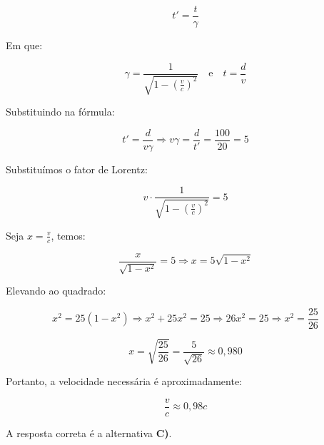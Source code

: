 \begin{flushleft}
\[
t' = \frac{t}{\gamma}
\]

Em que:

\[
\gamma = \frac{1}{\sqrt{1 - \left(\frac{v}{c}\right)^2}}
\quad \text{e} \quad
t = \frac{d}{v}
\]

Substituindo na fórmula:

\[
t' = \frac{d}{v \gamma}
\Rightarrow v\gamma = \frac{d}{t'} = \frac{100}{20} = 5
\]

Substituímos o fator de Lorentz:

\[
v \cdot \frac{1}{\sqrt{1 - \left( \frac{v}{c} \right)^2}} = 5
\]

Seja $x = \frac{v}{c}$, temos:

\[
\frac{x}{\sqrt{1 - x^2}} = 5
\Rightarrow x = 5 \sqrt{1 - x^2}
\]

Elevando ao quadrado:

\[
x^2 = 25(1 - x^2) \Rightarrow x^2 + 25x^2 = 25 \Rightarrow 26x^2 = 25 \Rightarrow x^2 = \frac{25}{26}
\]

\[
x = \sqrt{\frac{25}{26}} = \frac{5}{\sqrt{26}} \approx 0{,}980
\]

Portanto, a velocidade necessária é aproximadamente:

\[
\frac{v}{c} \approx 0{,}98c
\]

\vspace{0.2cm}

A resposta correta é a alternativa \colorbox{green!50}{\textbf{C)}}.

\end{flushleft}


